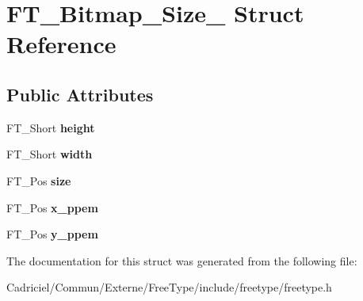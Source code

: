 \hypertarget{struct_f_t___bitmap___size__}{\section{F\-T\-\_\-\-Bitmap\-\_\-\-Size\-\_\- Struct Reference}
\label{struct_f_t___bitmap___size__}
}
\subsection*{Public Attributes}
\begin{DoxyCompactItemize}
\item 
\hypertarget{struct_f_t___bitmap___size___adf2f24039b458ff4674712886f242262}{F\-T\-\_\-\-Short {\bfseries height}}\label{struct_f_t___bitmap___size___adf2f24039b458ff4674712886f242262}

\item 
\hypertarget{struct_f_t___bitmap___size___ab9da94223f75a89a649d1e6d018b17f1}{F\-T\-\_\-\-Short {\bfseries width}}\label{struct_f_t___bitmap___size___ab9da94223f75a89a649d1e6d018b17f1}

\item 
\hypertarget{struct_f_t___bitmap___size___a1db23a6220fb6bcb712430821a6e5352}{F\-T\-\_\-\-Pos {\bfseries size}}\label{struct_f_t___bitmap___size___a1db23a6220fb6bcb712430821a6e5352}

\item 
\hypertarget{struct_f_t___bitmap___size___a6f877a792d2dc93328037c928979215f}{F\-T\-\_\-\-Pos {\bfseries x\-\_\-ppem}}\label{struct_f_t___bitmap___size___a6f877a792d2dc93328037c928979215f}

\item 
\hypertarget{struct_f_t___bitmap___size___a60d4d003d09fd57505f69f39e31e19c1}{F\-T\-\_\-\-Pos {\bfseries y\-\_\-ppem}}\label{struct_f_t___bitmap___size___a60d4d003d09fd57505f69f39e31e19c1}

\end{DoxyCompactItemize}


The documentation for this struct was generated from the following file\-:\begin{DoxyCompactItemize}
\item 
Cadriciel/\-Commun/\-Externe/\-Free\-Type/include/freetype/freetype.\-h\end{DoxyCompactItemize}
